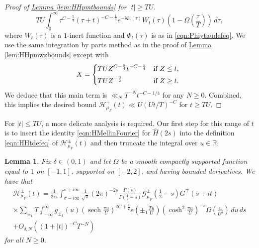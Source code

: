 \documentclass[11pt,a4paper]{amsart}
\newcommand{\Gscr}{\mathscr{G}}
\newcommand{\HH}{\mathcal{H}}
\newcommand{\R}{\mathbb{R}}
\DeclareMathOperator{\sech}{sech}
\numberwithin{equation}{section}
\newtheorem{lemma}[equation]{Lemma}
\theoremstyle{remark}
\theoremstyle{definition}
\begin{document}
\begin{proof}[Proof of {\hyperref[lem:HHpmtbounds]{Lemma \ref*{lem:HHpmtbounds}}} for $|t| \geq TU$]
\[TU \int_{0}^{\infty} \tau^{C - \frac{5}{4}} (\tau + t)^{-C - \frac{1}{4}} e^{-i\Phi_t(\tau)} W_t(\tau) \left(1 - \Omega\left(\frac{\tau}{T}\right)\right) \, d\tau,\]
where $W_t(\tau)$ is a $1$-inert function and $\Phi_t(\tau)$ is as in \eqref{eqn:Phiytaudefeq}. We use the same integration by parts method as in the proof of \hyperref[lem:HHpmwzbounds]{Lemma \ref*{lem:HHpmwzbounds}} except with
\[X = \begin{dcases*}
TU Z^{C - \frac{5}{4}} t^{-C - \frac{1}{4}} & if $Z \leq t$,	\\
TU Z^{-\frac{3}{2}} & if $Z \geq t$.
\end{dcases*}\]
We deduce that this main term is $\ll_N T^{-N} t^{-C - 1/4}$ for any $N \geq 0$. Combined, this implies the desired bound $\HH_{\mu_F}^{+}(t) \ll U (Ut/T)^{-C}$ for $t \geq TU$.
\end{proof}

For $|t| \leq TU$, a more delicate analysis is required. Our first step for this range of $t$ is to insert the identity \eqref{eqn:HMellinFourier} for $\widehat{H}(2s)$ into the definition \eqref{eqn:HHtdefeq} of $\HH_{\mu_F}^{\pm}(t)$ and then truncate the integral over $u \in \R$.

\begin{lemma}
Fix $\delta \in (0,1)$ and let $\Omega$ be a smooth compactly supported function equal to $1$ on $[-1,1]$, supported on $[-2,2]$, and having bounded derivatives. We have that
\begin{multline}
\label{eqn:HHtdoubleint}
\HH_{\mu_F}^{\pm}(t) = \frac{1}{2\pi i} \int_{\sigma - i\infty}^{\sigma + i\infty} \frac{1}{\sqrt{\pi}} (2\pi)^{-2s} \frac{\Gamma(s)}{\Gamma\left(\frac{1}{2} - s\right)} \Gscr_{\mu_F}^{\pm}\left(\frac{1}{2} - s\right) G^{\mp}(s + it)	\\
\times \sum_{\pm_1} T \int_{-\infty}^{\infty} g_{\pm_1}(u) \left(\sech \frac{\pi u}{U}\right)^{2C + \frac{1}{2}} e\left(\pm_1 \frac{Tu}{U}\right) \left(\cosh^2 \frac{\pi u}{U}\right)^{-s} \Omega\left(\frac{u}{U^{\delta}}\right) \, du \, ds	\\
+ O_{\delta,N}\left((1 + |t|)^{-C} T^{-N}\right)
\end{multline}
for all $N \geq 0$.
\end{lemma}
\end{document}
